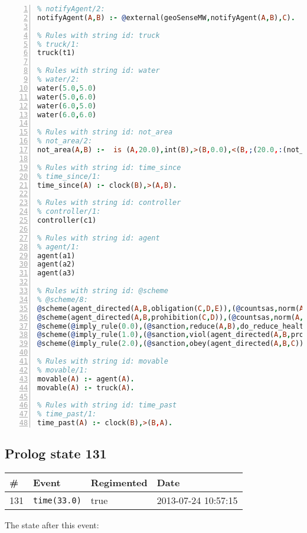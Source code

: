 \documentclass[11pt]{article}\usepackage[utf8]{inputenc}\usepackage{geometry}
\begin{document}
\begin{lstlisting}[language=Prolog, numbers=left]
% Rules with string id: notifyAgent
% notifyAgent/2:
notifyAgent(A,B) :- @external(geoSenseMW,notifyAgent(A,B),C).

% Rules with string id: truck
% truck/1:
truck(t1)

% Rules with string id: water
% water/2:
water(5.0,5.0)
water(5.0,6.0)
water(6.0,5.0)
water(6.0,6.0)

% Rules with string id: not_area
% not_area/2:
not_area(A,B) :-  is (A,20.0),int(B),>(B,0.0),<(B,;(20.0,:(not_area(A,B), is (-(B),20.0)))),int(A),>(A,0.0),<(A,;(20.0,:(area(A,B),-(int(A))))),int(B),>(A,0.0),>(B,0.0),<(A,21.0),<(B,21.0).

% Rules with string id: time_since
% time_since/1:
time_since(A) :- clock(B),>(A,B).

% Rules with string id: controller
% controller/1:
controller(c1)

% Rules with string id: agent
% agent/1:
agent(a1)
agent(a2)
agent(a3)

% Rules with string id: @scheme
% @scheme/8:
@scheme(agent_directed(A,B,obligation(C,D,E)),(@countsas,norm(A,B,F,obligation(C,D,E)),F),false,(listTrue(C)),(time_past(D)),false,[plus(viol(agent_directed(A,B,obligation(C,D,E))))|[]],[plus(obey(agent_directed(A,B,obligation(C,D,E))))|[]])
@scheme(agent_directed(A,B,prohibition(C,D)),(@countsas,norm(A,B,E,prohibition(C,D)),E),(listTrue(C)),false,(false),false,[plus(viol(agent_directed(A,B,prohibition(C,D))))|[]],[plus(obey(agent_directed(A,B,prohibition(C,D))))|[]])
@scheme(@imply_rule(0.0),(@sanction,reduce(A,B),do_reduce_health(A,B),notifyAgent(A,changed(status))),true,false,false,false,[min(reduce(A,B))|[]],[])
@scheme(@imply_rule(1.0),(@sanction,viol(agent_directed(A,B,prohibition(C,D))),do_sanction(D)),true,false,false,false,[min(viol(agent_directed(A,B,prohibition(C,D))))|[]],[])
@scheme(@imply_rule(2.0),(@sanction,obey(agent_directed(A,B,C))),true,false,false,false,[min(obey(agent_directed(A,B,C)))|[]],[])

% Rules with string id: movable
% movable/1:
movable(A) :- agent(A).
movable(A) :- truck(A).

% Rules with string id: time_past
% time_past/1:
time_past(A) :- clock(B),>(B,A).

\end{lstlisting}
\clearpage 
\subsection{Prolog state 131}
\begin{table}[ht]
\centering 
\begin{tabular}{l l l l} 
\textbf{\#} & \textbf{Event} & \textbf{Regimented} & \textbf{Date} \\ [0.5ex] 
\hline
131&\texttt{time(33.0)}&true&2013-07-24 10:57:15\\ [1ex] \hline\end{tabular}
\end{table}
The state after this event:
\end{document}
